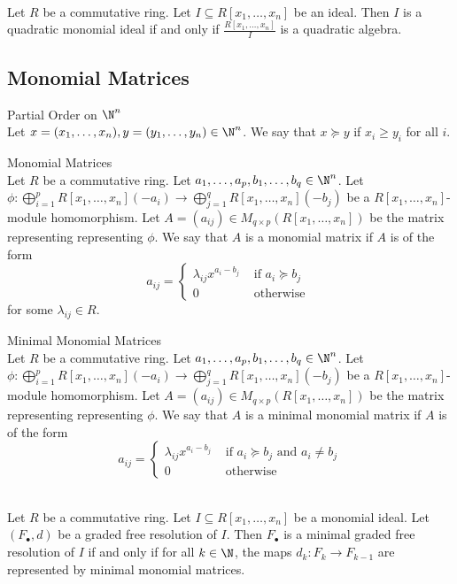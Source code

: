 \documentclass[a4paper]{article}
\begin{document}
\begin{lmm}{}{}\\
Let $R$ be a commutative ring. Let $I\subseteq R[x_1,\dots,x_n]$ be an ideal. Then $I$ is a quadratic monomial ideal if and only if $\frac{R[x_1,\dots,x_n]}{I}$ is a quadratic algebra. 
\end{lmm}

\subsection{Monomial Matrices}
\begin{defn}{Partial Order on $\N^n$}{}\\
Let $x=(x_1,\dots,x_n),y=(y_1,\dots,y_n)\in\N^n$. We say that $x\succeq y$ if $x_i\geq y_i$ for all $i$. 
\end{defn}

\begin{defn}{Monomial Matrices}{}\\
Let $R$ be a commutative ring. Let $a_1,\dots,a_p,b_1,\dots,b_q\in\N^n$. Let $\phi:\bigoplus_{i=1}^pR[x_1,\dots,x_n](-a_i)\to\bigoplus_{j=1}^qR[x_1,\dots,x_n](-b_j)$ be a $R[x_1,\dots,x_n]$-module homomorphism. Let $A=(a_{ij})\in M_{q\times p}(R[x_1,\dots,x_n])$ be the matrix representing representing $\phi$. We say that $A$ is a monomial matrix if $A$ is of the form $$a_{ij}=\begin{cases}
\lambda_{ij}x^{a_i-b_j} & \text{ if }a_i\succeq b_j\\
0 & \text{ otherwise }
\end{cases}$$ for some $\lambda_{ij}\in R$. 
\end{defn}

\begin{defn}{Minimal Monomial Matrices}{}\\
Let $R$ be a commutative ring. Let $a_1,\dots,a_p,b_1,\dots,b_q\in\N^n$. Let $\phi:\bigoplus_{i=1}^pR[x_1,\dots,x_n](-a_i)\to\bigoplus_{j=1}^qR[x_1,\dots,x_n](-b_j)$ be a $R[x_1,\dots,x_n]$-module homomorphism. Let $A=(a_{ij})\in M_{q\times p}(R[x_1,\dots,x_n])$ be the matrix representing representing $\phi$. We say that $A$ is a minimal monomial matrix if $A$ is of the form $$a_{ij}=\begin{cases}
\lambda_{ij}x^{a_i-b_j} & \text{ if }a_i\succeq b_j\text{ and }a_i\neq b_j\\
0 & \text{ otherwise }
\end{cases}$$
\end{defn}

\begin{prp}{}{}\\
Let $R$ be a commutative ring. Let $I\subseteq R[x_1,\dots,x_n]$ be a monomial ideal. Let $(F_\bullet,d)$ be a graded free resolution of $I$. Then $F_\bullet$ is a minimal graded free resolution of $I$ if and only if for all $k\in\N$, the maps $d_k:F_k\to F_{k-1}$ are represented by minimal monomial matrices. 
\end{prp}
\end{document}
